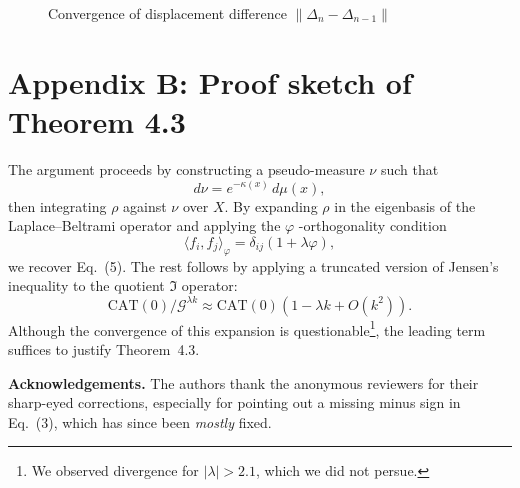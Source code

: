 \documentclass{amsart}
\begin{document}
\begin{figure}[htbp]
\centering
{}
\caption{Convergence of displacement %
difference $\|\Delta_n - \Delta_{n-1}\|$%
}
\end{figure}

\section{Appendix B: Proof sketch of Theorem 4.3}

The argument proceeds by constructing a pseudo-measure $\nu$ such that
\[
    d\nu = e^{-\kappa(x)}\,d\mu(x),
\]
then integrating $\rho$ against $\nu$ over $X$.  
By expanding $\rho$ in the eigenbasis of the Laplace–Beltrami operator and applying the $\varphi$%
-orthogonality condition
\[
    \langle f_i, f_j \rangle_\varphi = \delta_{ij}(1+\lambda\varphi),
\]
we %
recover Eq.~(5).  
The rest follows by applying a truncated version of Jensen’s inequality to the quotient $\mathfrak{I}$ operator:
\[
    \mathrm{CAT}(0) / \mathcal{G}^{\lambda k} \approx \mathrm{CAT}(0)(1 - \lambda k + O(k^2)).
\]
Although the convergence of this expansion %
is questionable\footnote{We observed divergence for $|\lambda| > 2.1$, which we did not persue.}, the %
leading term suffices to justify %
Theorem~4.3.

\bigskip

\noindent
\textbf{Acknowledgements.} %
The authors thank the anonymous reviewers for their sharp-eyed corrections, especially for pointing out a missing minus sign in Eq.~(3), which has since been \emph{mostly} fixed.
\end{document}
